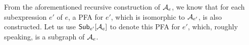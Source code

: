  



From the aforementioned recursive construction of $\mathcal{A}_e$, we know that for each subexpression $e'$ of $e$, a PFA for $e'$, which is isomorphic to $\mathcal{A}_{e'}$, is also constructed. Let us use ${\sf Sub}_{e'}[\mathcal{A}_e]$ to denote this PFA for $e'$, which, roughly speaking, is a subgraph of $\mathcal{A}_e$.

  
